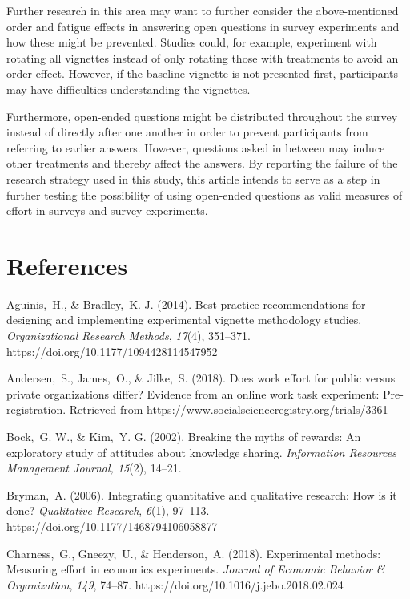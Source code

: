 \documentclass{article}
\begin{document}
Further research in this area may want to further consider the above-mentioned order and fatigue effects in answering open questions in survey experiments and how these might be prevented. Studies could, for example, experiment with rotating all vignettes instead of only rotating those with treatments to avoid an order effect. However, if the baseline vignette is not presented first, participants may have difficulties understanding the vignettes.

Furthermore, open-ended questions might be distributed throughout the survey instead of directly after one another in order to prevent participants from referring to earlier answers. However, questions asked in between may induce other treatments and thereby affect the answers. By reporting the failure of the research strategy used in this study, this article intends to serve as a step in further testing the possibility of using open-ended questions as valid measures of effort in surveys and survey experiments.



\section{\textbf{References}}

Aguinis, H., \& Bradley, K. J. (2014). Best practice recommendations for designing and implementing experimental vignette methodology studies. \emph{Organizational Research Methods}, \emph{17}(4), 351--371. https://doi.org/10.1177/1094428114547952

Andersen, S., James, O., \& Jilke, S. (2018). Does work effort for public versus private organizations differ? Evidence from an online work task experiment: Pre-registration. Retrieved from https://www.socialscienceregistry.org/trials/3361

Bock, G. W., \& Kim, Y. G. (2002). Breaking the myths of rewards: An exploratory study of attitudes about knowledge sharing. \emph{Information Resources Management Journal, 15}(2), 14--21.

Bryman, A. (2006). Integrating quantitative and qualitative research: How is it done? \emph{Qualitative Research}, \emph{6}(1), 97--113. https://doi.org/10.1177/1468794106058877

Charness, G., Gneezy, U., \& Henderson, A. (2018). Experimental methods: Measuring effort in economics experiments. \emph{Journal of Economic Behavior \& Organization}, \emph{149}, 74--87. https://doi.org/10.1016/j.jebo.2018.02.024
\end{document}
